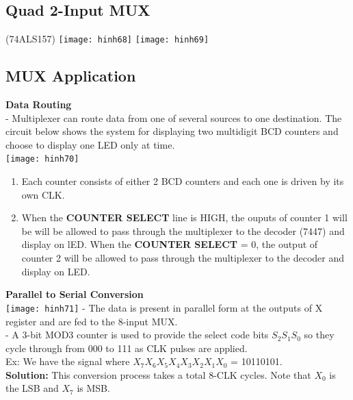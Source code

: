 \documentclass[12pt]{article}
\begin{document}
\subsection{Quad 2-Input MUX} (74ALS157)
\texttt{[image: hinh68]}
\bigbreak
\texttt{[image: hinh69]}
\bigbreak

\subsection{MUX Application}
\textbf{Data Routing} \\
- Multiplexer can route data from one of several sources to one destination. The circuit below shows the system for displaying two multidigit BCD counters and choose to display one LED only at time. \\
\texttt{[image: hinh70]}
\bigbreak
\begin{enumerate}
    \item Each counter consists of either 2 BCD counters and each one is driven by its own CLK.
    \item When the \textbf{COUNTER SELECT} line is HIGH, the ouputs of counter 1 will be will be allowed to pass through the multiplexer to the decoder (7447) and display on lED. When the \textbf{COUNTER SELECT} = 0, the output of counter 2 will be allowed to pass through the multiplexer to the decoder and display on LED.
\end{enumerate}
\bigbreak
\textbf{Parallel to Serial Conversion} \\
\texttt{[image: hinh71]}
\bigbreak
- The data is present in parallel form at the outputs of X register and are fed to the 8-input MUX. \\
- A 3-bit MOD3 counter is used to provide the select code bits $S_{2} S_{1} S_{0}$
 so they cycle through from 000 to 111 as CLK pulses are applied. \\
 Ex: We have the signal where $X_{7} X_{6} X_{5} X_{4} X_{3} X_{2} X_{1} X_{0}$ = 10110101. \\
 \textbf{Solution:} This conversion process takes a total 8-CLK cycles. Note that $X_{0}$ is the LSB and $X_{7}$ is MSB. \\
 \bigbreak
\end{document}
